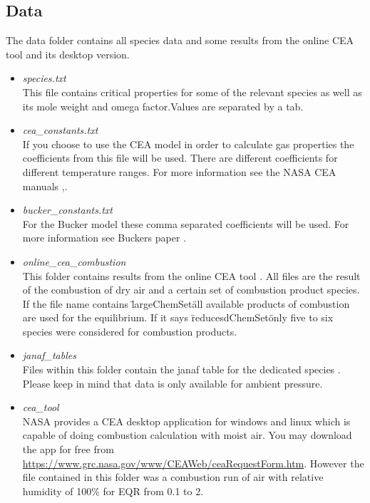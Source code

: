\documentclass{article}
\begin{document}
    \subsection{Data}
    The data folder contains all species data and some results from  the online CEA tool and its desktop version. 
        \begin{itemize}
            \item \textit{species.txt}\\
                This file contains critical properties for some of the relevant species as well as its mole weight and omega factor.Values are separated by a tab.
            \item \textit{cea\_constants.txt}\\
                If you choose to use the CEA model in order to calculate gas properties the coefficients from this file will be used. There are different coefficients for different temperature ranges. For more information see the NASA CEA manuals \cite{CEA1},\cite{CEA2}.
            \item \textit{bucker\_constants.txt}\\
                For the Bucker model these comma separated coefficients will be used. For more information see Buckers paper \cite{bucker}. 
            \item \textit{online\_cea\_combustion}\\
                This folder contains results from the online CEA tool \cite{onlineCEA}. All files are the result of the combustion of dry air and a certain set of combustion product species. If the file name contains \"largeChemSet\" all available products of combustion are used for the equilibrium. If it says \"reducesdChemSet\" only five to six species were considered for combustion products. 
            \item \textit{janaf\_tables}\\
                Files within this folder contain the janaf table for the dedicated species \cite{janaf}. Please keep in mind that data is only available for ambient pressure.
            \item \textit{cea\_tool}\\
                NASA provides a CEA desktop application for windows and linux which is capable of doing combustion calculation with moist air. You may download the app for free from \url{https://www.grc.nasa.gov/www/CEAWeb/ceaRequestForm.htm}. However the file contained in this folder was a combustion run of air with relative humidity of 100\% for EQR from 0.1 to 2.
        \end{itemize}
\end{document}
